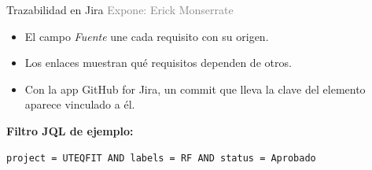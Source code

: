 \documentclass[aspectratio=169,11pt]{beamer}
\newcommand{\expone}[1]{\hfill{\scriptsize\textcolor{gray}{Expone: #1}}}
\begin{document}
\begin{frame}[fragile]{Trazabilidad en Jira}
  \expone{Erick Monserrate}
  \begin{center}
  \end{center}
  \begin{itemize}
    \item El campo \emph{Fuente} une cada requisito con su origen.
    \item Los enlaces muestran qué requisitos dependen de otros.
    \item Con la app GitHub for Jira, un commit que lleva la clave del
          elemento aparece vinculado a él.
  \end{itemize}
  \vspace{-0.2cm}
  {\footnotesize\textbf{Filtro JQL de ejemplo:}}
\begin{verbatim}
project = UTEQFIT AND labels = RF AND status = Aprobado
\end{verbatim}
\end{frame}
\end{document}
